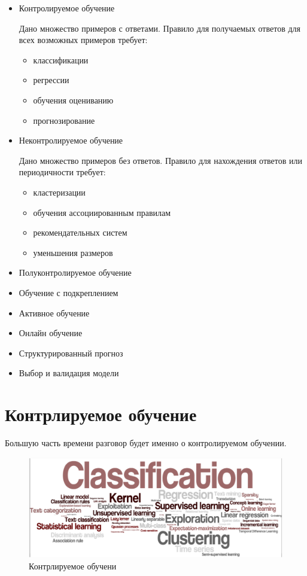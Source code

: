 \documentclass[10pt,a4paper,oneside,titlepage]{report}
\theoremstyle{defenition}
\theoremstyle{theorem}
\begin{document}
\begin{itemize}
	\item Контролируемое обучение

	Дано множество примеров с ответами. Правило для получаемых ответов для всех возможных примеров требует:
	\begin{itemize}
		\item классификации
		\item регрессии
		\item обучения оцениванию
		\item прогнозирование
	\end{itemize}
	\item Неконтролируемое обучение

	Дано множество примеров без ответов. Правило для нахождения ответов или периодичности требует:
	\begin{itemize}
		\item кластеризации
		\item обучения ассоциированным правилам
		\item рекомендательных систем
		\item уменьшения размеров
	\end{itemize}
	\item Полуконтролируемое обучение
	\item Обучение с подкреплением
	\item Активное обучение
	\item Онлайн обучение
	\item Структурированный прогноз
	\item Выбор и валидация модели
\end{itemize}

\section{Контрлируемое обучение}

Большую часть времени разговор будет именно о контролируемом обучении.

\begin{figure}[h!]
	\centering
	\includegraphics[width=0.7\linewidth]{pictures/SupervisedLearning}
	\caption{Контрлируемое обучени}
	\label{fig:supervisedlearning}
\end{figure}
\end{document}
